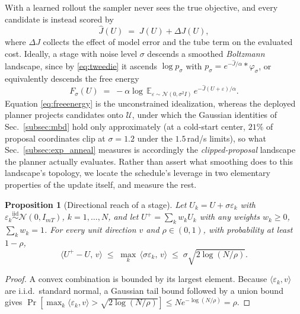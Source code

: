 \documentclass[letterpaper,10pt,conference]{ieeeconf}
\newtheorem{proposition}{Proposition}
\begin{document}
With a learned rollout the sampler never sees the true objective, and every candidate is instead scored by
\begin{equation}
\hat J(U) \;=\; J(U) + \Delta J(U),
\label{eq:jhat}
\end{equation}
where $\Delta J$ collects the effect of model error and the tube term on the evaluated cost.
Ideally, a stage with noise level $\sigma$ descends a smoothed \emph{Boltzmann} landscape, since by \eqref{eq:tweedie} it ascends $\log p_\sigma$ with $p_\sigma = e^{-\hat J/\alpha} * \varphi_\sigma$, or equivalently descends the free energy
\begin{equation}
F_\sigma(U) \;=\; -\alpha \log\, \mathbb{E}_{\varepsilon \sim \mathcal{N}(0, \sigma^{2} I)}\,
e^{-\hat J(U + \varepsilon)/\alpha} .
\label{eq:freeenergy}
\end{equation}
Equation \eqref{eq:freeenergy} is the unconstrained idealization, whereas the deployed planner projects candidates onto $\mathcal{U}$, under which the Gaussian identities of Sec.~\ref{subsec:mbd} hold only approximately (at a cold-start center, $21\%$ of proposal coordinates clip at $\sigma = 1.2$ under the $1.5$\,rad/s limits), so what Sec.~\ref{subsec:exp_anneal} measures is accordingly the \emph{clipped-proposal} landscape the planner actually evaluates.
Rather than assert what smoothing does to this landscape's topology, we locate the schedule's leverage in two elementary properties of the update itself, and measure the rest.

\begin{proposition}[Directional reach of a stage]\label{prop:reach}
Let $U_k = U + \sigma \varepsilon_k$ with $\varepsilon_k \overset{\mathrm{iid}}{\sim} \mathcal{N}(0, I_{mT})$, $k = 1, \dots, N$, and let $U^{+} = \sum_k w_k U_k$ with any weights $w_k \ge 0$, $\sum_k w_k = 1$.
For every unit direction $v$ and $\rho \in (0, 1)$, with probability at least $1 - \rho$,
\begin{equation}
\big\langle U^{+} - U,\, v \big\rangle
\;\le\; \max_k\, \big\langle \sigma \varepsilon_k,\, v \big\rangle
\;\le\; \sigma \sqrt{2 \log (N/\rho)} .
\label{eq:reach}
\end{equation}
\end{proposition}
\begin{proof}
A convex combination is bounded by its largest element. Because $\langle \varepsilon_k,v\rangle$ are i.i.d.\ standard normal, a Gaussian tail bound followed by a union bound gives $\Pr[\max_k \langle \varepsilon_k,v\rangle > \sqrt{2\log(N/\rho)}] \le N e^{-\log(N/\rho)}=\rho$.
\end{proof}
\end{document}
